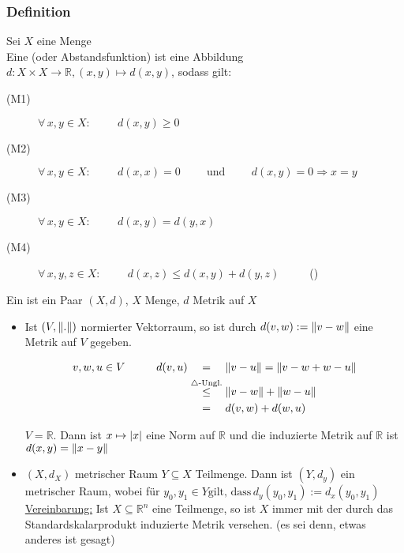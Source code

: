 \subsubsection[Metrik]{Definition} %
 \label{ssub:definition}
Sei $X$ eine Menge \\
Eine  (oder Abstandsfunktion) ist eine Abbildung $d: X \times X \to \mathbb{R} , (x,y) \mapsto d(x,y)$, sodass gilt:
\begin{description}
	\item[(M1)] $\forall\, x,y \in X: \hspace{1cm}  d(x,y) \geq  0$
	\item[(M2)] $\forall\, x,y \in X: \hspace{1cm}  d(x,x)=0   \hspace{1cm} \text{und} \hspace{1cm} 
		 		d(x,y)=0 \Rightarrow x=y$
	\item[(M3)] $\forall\, x,y \in X: \hspace{1cm} d(x,y)=d(y,x)$
	\item[(M4)] $\forall\, x,y,z \in X: \hspace{1cm}  d(x,z) \leq d(x,y)+d(y,z) \hspace{1cm}$ () 
\end{description}
Ein  ist ein Paar $(X,d)$, $X$ Menge, $d$ Metrik auf $X$
\begin{itemize}
	\item Ist $(V,\norm{.})$ normierter Vektorraum, so ist durch $d(v,w):= \norm{v-w}$ eine Metrik auf $ V$ gegeben.

\begin{align*}
	v,w,u \in V \hspace{1cm} d(v,u) &\stackrel{\hphantom{\text{$\triangle$-Ungl.}}}{=}  \norm{v-u} = \norm{v-w+w-u} \\
	&\stackrel{\text{$\triangle$-Ungl.}}{\leq} \norm{v-w} + \norm{w-u} \\ 
	&\stackrel{\hphantom{\text{$\triangle$-Ungl.}}}{=} d(v,w)+d(w,u)
\end{align*}
 
$V=\mathbb{R}$. Dann ist $x \mapsto \lvert x\rvert $ eine Norm auf $\mathbb{R}$ und die induzierte Metrik auf $\mathbb{R}$ ist $d(x,y)=\norm{x-y}$
 \item $(X,d_X)$ metrischer Raum $Y\subseteq X$ Teilmenge. Dann ist $(Y,d_y)$ ein metrischer Raum, wobei für $y_0,y_1 \in Y \text{gilt, dass} \, d_y(y_0,y_1):=d_x(y_0,y_1)$ \\
 \underline{Vereinbarung:} Ist $X \subseteq \mathbb{R}^n$ eine Teilmenge, so ist $X$ immer mit der durch das Standardskalarprodukt induzierte Metrik versehen. (es sei denn, etwas anderes ist gesagt) 
\end{itemize}

